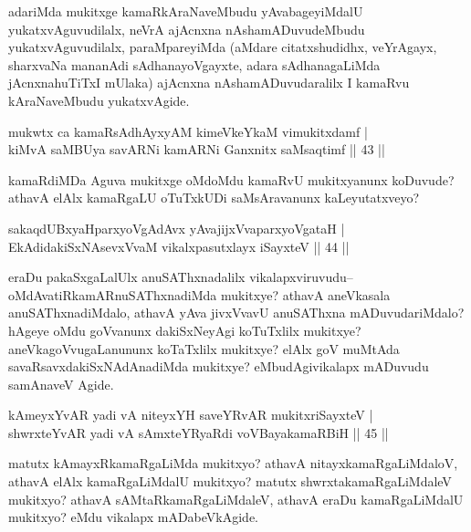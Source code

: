 \begin{artha}
adariMda mukitxge kamaRkAraNaveMbudu yAvabageyiMdalU yukatxvAguvudilalx, neVrA ajAcnxna nAshamADuvudeMbudu yukatxvAguvudilalx, paraMpareyiMda (aMdare citatxshudidhx, veYrAgayx, sharxvaNa mananAdi sAdhanayoVgayxte, adara sAdhanagaLiMda jAcnxnahuTiTxI mUlaka) ajAcnxna nAshamADuvudaralilx I kamaRvu kAraNaveMbudu yukatxvAgide.
\end{artha}


\begin{shl}
mukwtx ca kamaRsAdhAyxyAM kimeVkeYkaM vimukitxdamf |\\
kiMvA saMBUya savARNi kamARNi Ganxnitx saMsaqtimf \hfill || 43 ||
\end{shl}

\begin{artha}
kamaRdiMDa Aguva mukitxge oMdoMdu kamaRvU mukitxyanunx koDuvude? athavA elAlx kamaRgaLU oTuTxkUDi saMsAravanunx kaLeyutatxveyo?
\end{artha}

\begin{shl}
sakaqdUBxyaHparxyoVgAdAvx yAvajijxVvaparxyoVgataH |\\
EkAdidakiSxNAsevxVvaM vikalxpasutxlayx iSayxteV \hfill || 44 ||
\end{shl}

\begin{artha}
eraDu pakaSxgaLalUlx anuSAThxnadalilx vikalapxviruvudu-- oMdAvatiRkamARnuSAThxnadiMda mukitxye? athavA aneVkasala anuSAThxnadiMdalo, athavA yAva jivxVvavU anuSAThxna mADuvudariMdalo? hAgeye oMdu goVvanunx dakiSxNeyAgi koTuTxlilx mukitxye? aneVkagoVvugaLanununx  koTaTxlilx mukitxye? elAlx goV muMtAda savaRsavxdakiSxNAdAnadiMda mukitxye? eMbudAgivikalapx mADuvudu samAnaveV Agide.
\end{artha}

\begin{shl}
kAmeyxYvAR yadi vA niteyxYH saveYRvAR mukitxriSayxteV |\\
shwrxteYvAR yadi vA sAmxteYRyaRdi voVBayakamaRBiH \hfill || 45 ||
\end{shl}

\begin{artha}
matutx kAmayxRkamaRgaLiMda mukitxyo? athavA nitayxkamaRgaLiMdaloV, athavA elAlx kamaRgaLiMdalU mukitxyo? matutx shwrxtakamaRgaLiMdaleV mukitxyo? athavA sAMtaRkamaRgaLiMdaleV, athavA eraDu kamaRgaLiMdalU mukitxyo? eMdu vikalapx mADabeVkAgide. 
\end{artha}

